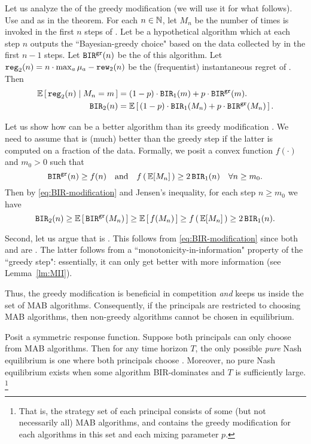 
Let us analyze the \BIR of the greedy modification (we will use it for what follows). Use \alg[1] and \alg[2] as in the theorem. For each $n\in\mathbb{N}$, let $M_n$ be the number of times \alg[1] is invoked in the first $n$ steps of \alg[2]. Let \alggr be a hypothetical algorithm which at each step $n$ outputs the ``Bayesian-greedy choice" based on the data collected by \alg[1] in the first $n-1$ steps. Let $\mathtt{BIR}^{\texttt{gr}}(n)$ be the \BIR of this algorithm. Let
    $\mathtt{reg}_2(n) = n\cdot \max_a \mu_a - \mathtt{rew}_2(n)$
be the (frequentist) instantaneous regret of \alg[2]. Then
\begin{align}
\E\sbr{ \mathtt{reg}_2(n) \mid M_n = m}
    &= (1-p) \cdot \BIR_1(m) + p \cdot \BIRgr(m). \nonumber \\
\BIR_2(n)
    &= \E\sbr{ (1-p) \cdot \BIR_1(M_n) + p \cdot \BIRgr(M_n) }.
    \label{eq:BIR-modification}
\end{align}

Let us show how \alg[1] can be a better algorithm than its greedy modification \alg[2]. We need to assume that \alg[1] is (much) better than the greedy step \alggr if the latter is computed on a fraction of the data. Formally, we posit a convex function $f(\cdot)$ and $m_0>0$ such that
\[ \BIRgr(n) \geq f(n)
    \quad\text{and}\quad
    f\rbr{\E[M_n]} \geq 2\, \BIR_1(n) \quad \forall n\geq m_0 .  \]
Then by \eqref{eq:BIR-modification} and Jensen's inequality, for each step $n\geq m_0$ we have
\[\BIR_2(n)
    \geq  \E\sbr{ \BIRgr(M_n) }
    \geq \E\sbr{ f(M_n) }
    \geq f\rbr{ \E[M_n] }
    \geq 2\,\BIR_1(n). \]

Second, let us argue that \alg[2] is \bmonotone. This follows from \eqref{eq:BIR-modification} since both \alg[1] and \alggr are \bmonotone. The latter follows from a ``monotonicity-in-information" property of the ``greedy step": essentially, it can only get better with more information
(see Lemma~\ref{lm:MII}).

Thus, the greedy modification is beneficial in competition \emph{and} keeps us inside the set of \bmonotone MAB algorithms. Consequently, if the principals are restricted to choosing \bmonotone MAB algorithms, then non-greedy algorithms cannot be chosen in equilibrium.

\begin{corollary}\label{cor:random-greedy}
Posit a symmetric \HardMaxRandom response function. Suppose both principals can only choose from \bmonotone MAB algorithms. Then for any time horizon $T$, the only possible \emph{pure} Nash equilibrium is one where both principals choose \DynGreedy. Moreover, no pure Nash equilibrium exists when some algorithm BIR-dominates \DynGreedy and $T$ is sufficiently large.
%
\footnote{That is, the strategy set of each principal consists of some (but not necessarily all) \bmonotone MAB algorithms, and contains the greedy modification for each algorithms in this set and each mixing parameter $p$.}
\end{corollary}

